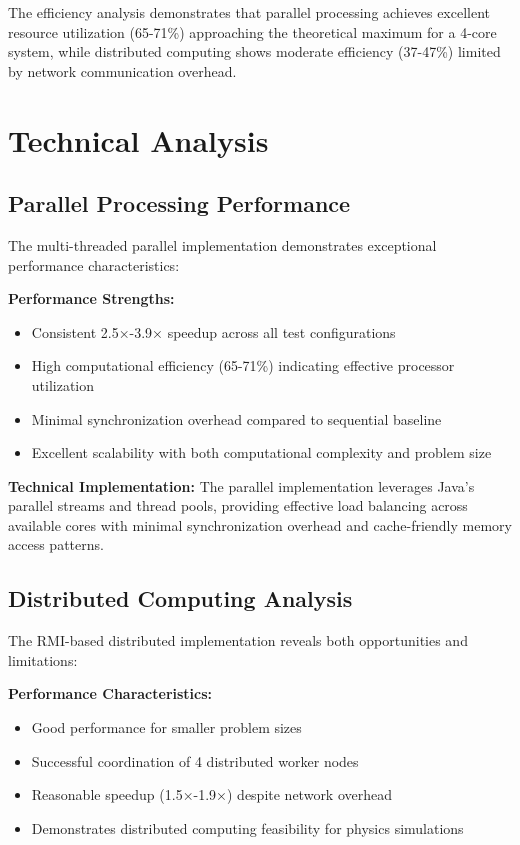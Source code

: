 \documentclass[sigconf]{acmart}
\begin{document}
The efficiency analysis demonstrates that parallel processing achieves excellent resource utilization (65-71\%) approaching the theoretical maximum for a 4-core system, while distributed computing shows moderate efficiency (37-47\%) limited by network communication overhead.

\section{Technical Analysis}

\subsection{Parallel Processing Performance}

The multi-threaded parallel implementation demonstrates exceptional performance characteristics:

\textbf{Performance Strengths:}
\begin{itemize}
    \item Consistent 2.5×-3.9× speedup across all test configurations
    \item High computational efficiency (65-71\%) indicating effective processor utilization
    \item Minimal synchronization overhead compared to sequential baseline
    \item Excellent scalability with both computational complexity and problem size
\end{itemize}

\textbf{Technical Implementation:}
The parallel implementation leverages Java's parallel streams and thread pools, providing effective load balancing across available cores with minimal synchronization overhead and cache-friendly memory access patterns.

\subsection{Distributed Computing Analysis}

The RMI-based distributed implementation reveals both opportunities and limitations:

\textbf{Performance Characteristics:}
\begin{itemize}
    \item Good performance for smaller problem sizes
    \item Successful coordination of 4 distributed worker nodes
    \item Reasonable speedup (1.5×-1.9×) despite network overhead
    \item Demonstrates distributed computing feasibility for physics simulations
\end{itemize}
\end{document}

